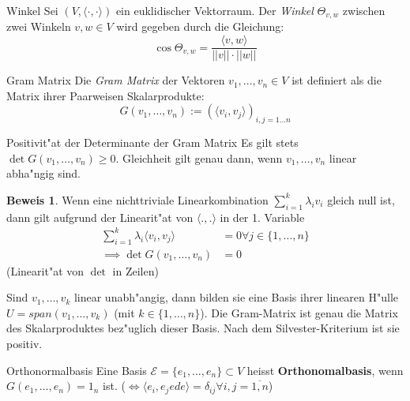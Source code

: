 \documentclass[oneside,fontsize=11pt,paper=a4,BCOR=0mm,DIV=12,automark,headsepline]{scrbook}
\theoremstyle{remark}
\theoremstyle{definition}
\theoremstyle{definition}
\newtheorem*{prof}{Beweis}
\theoremstyle{remark}
\begin{document}
\begin{definition}{Winkel}{}
  Sei $(V, \langle {\cdot,\cdot} \rangle)$ ein euklidischer Vektorraum. Der \emph{Winkel}
  $\Theta_{v,w}$ zwischen zwei Winkeln $v,w\in V$ wird gegeben durch die Gleichung: \[\cos
    \Theta_{v,w} = \frac{\langle v, w\rangle}{||v||\cdot ||w||}\]
\end{definition}
\begin{definition}{Gram Matrix}{}
  Die \emph{Gram Matrix} der Vektoren $v_1, \ldots, v_n \in V$ ist definiert
  als die Matrix ihrer Paarweisen Skalarprodukte:
  \[G(v_1, \ldots, v_n):= (\langle v_i, v_j \rangle)_{i,j=1\ldots n}\]
\end{definition}
\begin{satz}{Positivit"at der Determinante der Gram Matrix}{}
  Es gilt stets $\det G(v_1, \ldots, v_n) \geq 0$. Gleichheit gilt genau dann, wenn \(v_1,\dots,v_n\)
  linear abha"ngig sind.
\end{satz}
\begin{prof}
  Wenn eine nichttriviale Linearkombination \(\sum_{i=1}^k \lambda_iv_i\) gleich null ist, dann gilt aufgrund der Linearit"at von \(\langle ., .\rangle\) in der 1. Variable \begin{align*}\sum_{i=1}^k \lambda_i\langle v_i, v_j\rangle &= 0 \forall j\in \{1, \dots, n\} \\ \implies \det G(v_1, \dots, v_n) &= 0\end{align*} (Linearit"at von \(\det\) in Zeilen)

  Sind \(v_1, \dots, v_k\) linear unabh"angig, dann bilden sie eine Basis ihrer linearen H"ulle \(U = span(v_1, \dots, v_k)\) (mit \(k \in \{1,\dots, n\}\)). Die Gram-Matrix ist genau die Matrix des Skalarproduktes bez"uglich dieser Basis. Nach dem Silvester-Kriterium ist sie positiv.
\end{prof}

\begin{definition}{Orthonormalbasis}{}
  Eine Basis $\mathcal{E} = \{e_1, \ldots, e_n\} \subset V$ heisst
  \textbf{Orthonomalbasis}, wenn $G(e_1, \ldots, e_n) = 1_n$ ist. ($\iff \langle
  {e_i, e_jede} \rangle = \delta_{ij} \forall i,j = \overline{1,n}$)
\end{definition}


\end{document}
